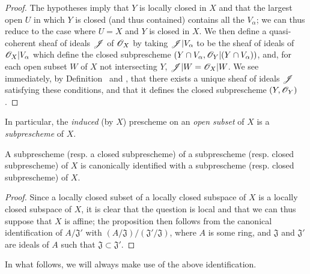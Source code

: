 \begin{proof}
\label{proof-1.4.1.5}
The hypotheses imply that $Y$ is locally closed in $X$ and that the largest open $U$ in which $Y$ is closed (and thus contained) contains all the $V_\alpha$;
we can thus reduce to the case where $U=X$ and $Y$ is closed in $X$.
We then define a quasi-coherent sheaf of ideals $\mathscr{J}$ of $\mathscr{O}_X$ by taking $\mathscr{J}|V_\alpha$ to be the sheaf of ideals of $\mathscr{O}_X|V_\alpha$ which define the closed subprescheme $(Y\cap V_\alpha,\mathscr{O}_Y|(Y\cap V_\alpha))$, and, for each open subset $W$ of $X$ not intersecting $Y$, $\mathscr{J}|W=\mathscr{O}_X|W$.
We see immediately, by Definition~ and , that there exists a unique sheaf of ideals $\mathscr{J}$ satisfying these conditions, and that it defines the closed subprescheme $(Y,\mathscr{O}_Y)$.
\end{proof}

In particular, the \emph{induced} (by $X$) prescheme on an \emph{open subset} of $X$ is a \emph{subprescheme} of $X$.

\begin{proposition}[4.1.6]
\label{I.4.1.6}
A subprescheme (resp. a closed subprescheme) of a subprescheme
(resp. closed subprescheme) of $X$ is canonically identified with a subprescheme (resp. closed subprescheme) of $X$.
\end{proposition}

\begin{proof}
\label{proof-1.4.1.6}
Since a locally closed subset of a locally closed subspace of $X$ is a locally closed subspace of $X$, it is clear  that the question is local and that we can thus suppose that $X$ is affine;
the proposition then follows from the canonical identification of $A/\mathfrak{J}'$ with $(A/\mathfrak{J})/(\mathfrak{J}'/\mathfrak{J})$, where $A$ is some ring, and $\mathfrak{J}$ and $\mathfrak{J}'$ are ideals of $A$ such that $\mathfrak{J}\subset\mathfrak{J}'$.
\end{proof}

In what follows, we will always make use of the above identification.

